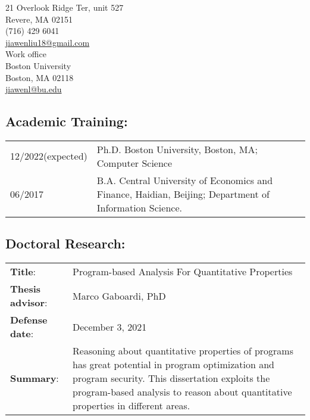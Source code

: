 \documentclass[12pt, letterpaper]{report}   %
\begin{document}
\setlength{\columnsep}{1.5in}
\begin{multicols}{1}{
\begin{center}{
21 Overlook Ridge Ter, unit 527 \\ Revere, MA 02151 \\ (716) 429 6041 \\ \hyperlink{mailto:personaladdress@gmail.com}{jiawenliu18@gmail.com}\\
Work office \\Boston University \\ Boston, MA 02118 \\\hyperlink{mailto:buemail@bu.edu}{jiawenl@bu.edu}\\}
\end{center}}
\end{multicols}

\subsection*{Academic Training:}
\begin{tabular}{p{}p{}}
12/2022\small(expected) &  Ph.D. Boston University, Boston, MA; Computer Science\\
06/2017  & B.A. Central University of Economics and Finance, Haidian, Beijing; Department of Information Science. \\
\end{tabular}

\subsection*{Doctoral Research:}
\begin{tabular}{p{}p{}}
\textbf{Title}: & Program-based Analysis For Quantitative Properties \\
\textbf{Thesis advisor}: & Marco Gaboardi, PhD\\
\textbf{Defense date}: & December 3, 2021 \\
\textbf{Summary}: & Reasoning about quantitative properties of programs has great potential in program optimization and program security. This dissertation exploits the program-based analysis to reason about quantitative properties in different areas.
\\
\end{tabular}
\end{document}
